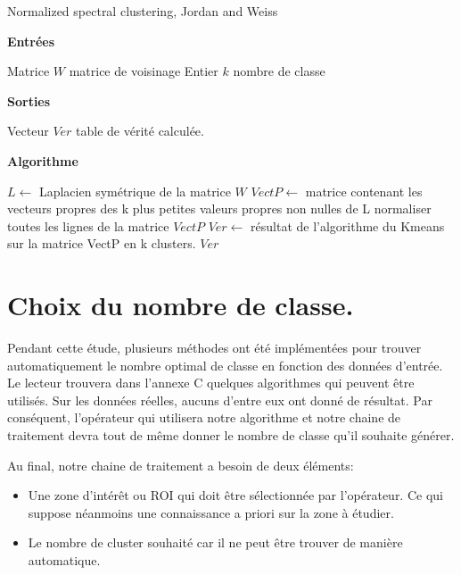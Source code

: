 \begin{algorithm}[H]
  \caption{Normalized spectral clustering, Jordan and Weiss }
  
  \textbf{Entrées}%
  \begin{algorithmic}[1]
    \STATE Matrice $W$ matrice de voisinage
    \STATE Entier $k$ nombre de classe
  \end{algorithmic}
  \bigskip

  \textbf{Sorties}%
  \begin{algorithmic}[1]
    \STATE Vecteur $Ver$ table de vérité calculée.
  \end{algorithmic}
  \bigskip
  
  \textbf{Algorithme}
  \begin{algorithmic}[1]
		\STATE $L\gets$ Laplacien symétrique de la matrice $W$
     	\STATE $VectP\gets$ matrice contenant les vecteurs propres des k plus petites valeurs propres non nulles de L
     	\STATE normaliser toutes les lignes de la matrice $VectP$
     	\STATE $Ver\gets$ résultat de l'algorithme du Kmeans sur la matrice VectP en k clusters.	
  \RETURN $Ver$
  \end{algorithmic}
\end{algorithm}

\section{Choix du nombre de classe.}

Pendant cette étude, plusieurs méthodes ont été implémentées pour trouver automatiquement le nombre optimal de classe en fonction des données d'entrée. Le lecteur trouvera dans l'annexe C quelques algorithmes qui peuvent être utilisés. Sur les données réelles, aucuns d'entre eux ont donné de résultat. Par conséquent, l'opérateur qui utilisera notre algorithme et notre chaine de traitement devra tout de même donner le nombre de classe qu'il souhaite générer. 

\medskip

Au final, notre chaine de traitement a besoin de deux éléments:

\begin{itemize}
\item Une zone d'intérêt ou ROI qui doit être sélectionnée par l'opérateur. Ce qui suppose néanmoins une connaissance a priori sur la zone à étudier.
\item Le nombre de cluster souhaité car il ne peut être trouver de manière automatique.
\end{itemize}

